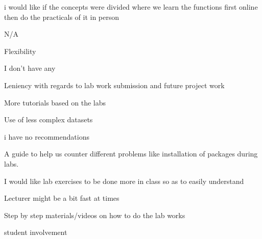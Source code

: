 \documentclass[
]{article}
\begin{document}
i would like if the concepts were divided where we learn the functions
first online then do the practicals of it in person

N/A

Flexibility

I don't have any~

Leniency with regards to lab work submission and future project work

More tutorials based on the labs

Use of less complex datasets

i have no recommendations

A guide to help us counter different problems like installation of
packages during labs.

I would like lab exercises to be done more in class so as to easily
understand~

Lecturer might be a bit fast at times

Step by step materials/videos on how to do the lab works~

student involvement~~
\end{document}
